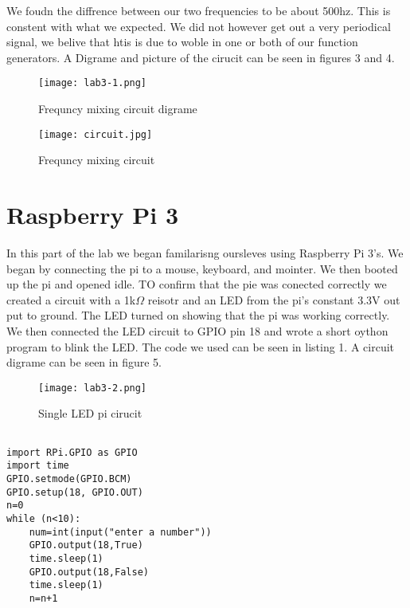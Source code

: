 \documentclass[prl,12pt,notitlepage,aps,onecolumn,superscriptaddress]{revtex4-1}
\newcommand{\ohm}{$\Omega$ }
\begin{document}
 We foudn the diffrence between our two frequencies to be about 500hz. This is constent with what we expected. We did not however get out a very periodical signal, we belive that htis is due to woble in one or both of our function generators. A Digrame and picture of the cirucit can be seen in figures 3 and 4.
 
\begin{figure}[h]
\begin{center}
\texttt{[image: lab3-1.png]}
\end{center}
\caption{\label{fig:pic} Frequncy mixing circuit digrame}
\end{figure} 
 
\begin{figure}[h]
\begin{center}
\texttt{[image: circuit.jpg]}
\end{center}
\caption{\label{fig:pic} Frequncy mixing circuit}
\end{figure}

\section{Raspberry Pi 3}
In this part of the lab we began familarisng oursleves using Raspberry Pi 3's. We began by connecting the pi to a mouse, keyboard, and mointer. We then booted up the pi and opened idle. TO confirm that the pie was conected correctly we created a circuit with a 1k\ohm reisotr and an LED from the pi's constant 3.3V out put to ground. The LED turned on showing that the pi was working correctly. We then connected the LED circuit to GPIO pin 18 and wrote a short oython program to blink the LED. The code we used can be seen in listing 1. A circuit digrame can be seen in figure 5.
\begin{figure}[h]
\begin{center}
\texttt{[image: lab3-2.png]}
\end{center}
\caption{\label{fig:pic} Single LED pi cirucit}
\end{figure} 

\begin{lstlisting}[caption=blinking LED, label=amb]

import RPi.GPIO as GPIO
import time
GPIO.setmode(GPIO.BCM)
GPIO.setup(18, GPIO.OUT)
n=0
while (n<10):
    num=int(input("enter a number"))
    GPIO.output(18,True)
    time.sleep(1)
    GPIO.output(18,False)
    time.sleep(1)
    n=n+1

\end{lstlisting}
\end{document}
